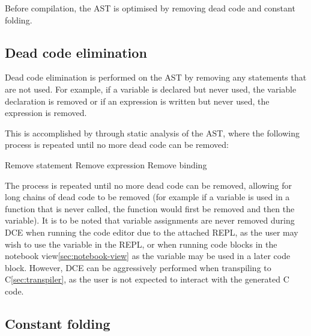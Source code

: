 Before compilation, the AST is optimised by removing dead code and constant folding.

\subsection{Dead code elimination}\label{subsec:dead-code-elimination}

Dead code elimination is performed on the AST by removing any statements that are not used.
For example, if a variable is declared but never used, the variable declaration is removed or if an expression is
written but never used, the expression is removed.

This is accomplished by through static analysis of the AST, where the following process is repeated until no more dead
code can be removed:

\begin{algorithmic}
                    \State Remove statement
                \EndIf
                    \State Remove expression
                \EndIf
                    \State Remove binding
                \EndIf
            \EndIf
        \EndFor
    \EndWhile
\end{algorithmic}

The process is repeated until no more dead code can be removed, allowing for long chains of dead code to be 
removed (for example if a variable is used in a function that is never called, the function would first be removed
and then the variable).
It is to be noted that variable assignments are never removed during DCE when running the code editor due to the 
attached REPL, as the user may wish to use the variable in the REPL\@, or when running code blocks in the notebook 
view\ref{sec:notebook-view} as the variable may be used in a later code block.
However, DCE can be aggressively performed when transpiling to C\ref{sec:transpiler}, as the user is not expected to 
interact with the generated C code.

\subsection{Constant folding}\label{subsec:constant-folding}

